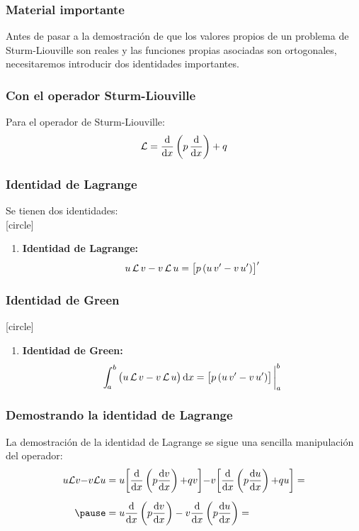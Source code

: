 \documentclass[12pt]{beamer}
\begin{document}
\begin{frame}
\frametitle{Material importante}
Antes de pasar a la demostración de que los valores propios de un problema de Sturm-Liouville son reales y las funciones propias asociadas son ortogonales, \pause necesitaremos introducir dos identidades importantes.
\end{frame}
\begin{frame}
\frametitle{Con el operador Sturm-Liouville}
Para el operador de Sturm-Liouville:
\pause
\begin{align*}
\mathcal{L} = \dv{x} \left( p \, \dv{x} \right) + q
\end{align*}
\end{frame}
\begin{frame}
\frametitle{Identidad de Lagrange}
Se tienen dos identidades:
\\
\bigskip
\pause
{}
[circle]
\begin{enumerate}[<+->]
\item \textbf{Identidad de Lagrange:} 
\begin{align*}
u \, \mathcal{L} \, v - v \, \mathcal{L} \, u = \big[ p \, (u \, {v}^{\prime} - v \, {u}^{\prime}) \big]^{\prime}
\end{align*}
\seti
\end{enumerate}
\end{frame}
\begin{frame}
\frametitle{Identidad de Green}
[circle]
\begin{enumerate}[<+->]    
\conti
\item \textbf{Identidad de Green:} 
\begin{align*}
\scaleint{5ex}_{\bs a}^{b} \, \big(u \, \mathcal{L} \, v - v \, \mathcal{L} \, u \big) \dd{x} = \big[ p \, (u \, \pderivada{v} - v \, \pderivada{u}) \big]\eval_{a}^{b}
\end{align*}
\end{enumerate}
\end{frame}
\begin{frame}
\frametitle{Demostrando la identidad de Lagrange}
La demostración de la identidad de Lagrange se sigue una sencilla manipulación del operador:
\pause
\begin{eqnarray*}
\begin{aligned}[b]
u  \mathcal{L} v {-} v \mathcal{L} u &= u \bigg[ \dv{x} \left( p \dv{v}{x} \right) {+} q v \bigg] {-} v \bigg[ \dv{x} \left( p \dv{u}{x} \right) {+} q u \bigg] = \\[0.5em] \pause
&= u \dv{x} \left( p \dv{v}{x} \right) - v \dv{x} \left( p \dv{u}{x} \right) = \\[0.5em]
\end{aligned}
\end{eqnarray*}
\end{frame}
\end{document}
